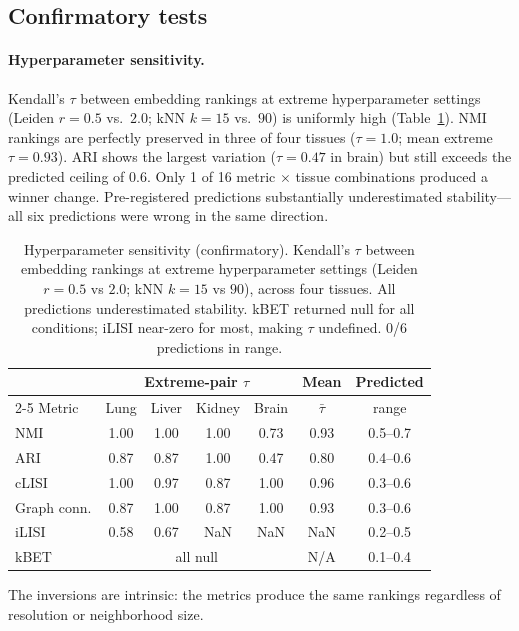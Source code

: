\documentclass[11pt]{article}
\begin{document}
\subsection{Confirmatory tests}
\label{sec:confirmatory}

\paragraph{Hyperparameter sensitivity.} Kendall's $\tau$ between embedding rankings at extreme hyperparameter settings (Leiden $r = 0.5$ vs.\ $2.0$; kNN $k = 15$ vs.\ $90$) is uniformly high (Table~\ref{tab:hyperparam}). NMI rankings are perfectly preserved in three of four tissues ($\tau = 1.0$; mean extreme $\tau = 0.93$). ARI shows the largest variation ($\tau = 0.47$ in brain) but still exceeds the predicted ceiling of $0.6$. Only 1 of 16 metric $\times$ tissue combinations produced a winner change. Pre-registered predictions substantially underestimated stability---all six predictions were wrong in the same direction.

\begin{table}[t]
\centering
\caption{Hyperparameter sensitivity (confirmatory). Kendall's $\tau$ between embedding rankings at extreme hyperparameter settings (Leiden $r = 0.5$ vs $2.0$; kNN $k = 15$ vs $90$), across four tissues. All predictions underestimated stability. kBET returned null for all conditions; iLISI near-zero for most, making $\tau$ undefined. 0/6 predictions in range.}
\label{tab:hyperparam}
\small
\begin{tabular}{@{}lcccccc@{}}
\toprule
 & \multicolumn{4}{c}{Extreme-pair $\tau$} & Mean & Predicted \\
\cmidrule(lr){2-5}
Metric & Lung & Liver & Kidney & Brain & $\bar{\tau}$ & range \\
\midrule
NMI & 1.00 & 1.00 & 1.00 & 0.73 & 0.93 & 0.5--0.7 \\
ARI & 0.87 & 0.87 & 1.00 & 0.47 & 0.80 & 0.4--0.6 \\
cLISI & 1.00 & 0.97 & 0.87 & 1.00 & 0.96 & 0.3--0.6 \\
Graph conn. & 0.87 & 1.00 & 0.87 & 1.00 & 0.93 & 0.3--0.6 \\
iLISI & 0.58 & 0.67 & NaN & NaN & NaN & 0.2--0.5 \\
kBET & \multicolumn{4}{c}{all null} & N/A & 0.1--0.4 \\
\bottomrule
\end{tabular}
\end{table}

The inversions are intrinsic: the metrics produce the same rankings regardless of resolution or neighborhood size.
\end{document}
